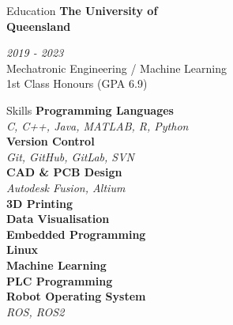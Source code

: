 \documentclass{custom-resume}
\begin{document}
{\begin{minipage}[t][23cm]{0.39\textwidth}
\begin{minipage}[t][23cm]{0.64\textwidth}
\begin{section}{Education}
      {
        \large
        \textbf{The University of\\ Queensland} \\[8pt]
      }

      \textit{2019 - 2023} \\[8pt]

      Mechatronic Engineering / Machine Learning \\[8pt]

      1st Class Honours (GPA 6.9)

    \end{section}


    \begin{section*}{Skills}
      \textbf{Programming Languages} \\[2pt]
      \textit{C, C++, Java, MATLAB, R, Python} \\[8pt]

      \textbf{Version Control} \\[2pt]
      \textit{Git, GitHub, GitLab, SVN} \\[8pt]

      \textbf{CAD \& PCB Design} \\[2pt]
      \textit{Autodesk Fusion, Altium} \\[8pt]

      \textbf{3D Printing} \\[8pt]

      \textbf{Data Visualisation} \\[8pt]

      \textbf{Embedded Programming} \\[8pt]

      \textbf{Linux} \\[8pt]

      \textbf{Machine Learning} \\[8pt]

      \textbf{PLC Programming} \\[8pt]

      \textbf{Robot Operating System} \\[2pt]
      \textit{ROS, ROS2}
    \end{section*}

  \end{minipage}
\end{minipage}}%
\hspace{0.03\textwidth}%
\end{document}
